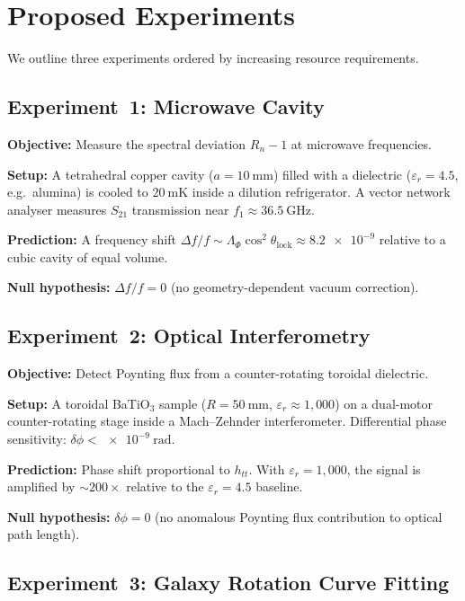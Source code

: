 \documentclass[aps,preprint,superscriptaddress,longbibliography]{revtex4-2}
\begin{document}
\section{Proposed Experiments}
\label{sec:experiments}

We outline three experiments ordered by increasing resource
requirements.

\subsection{Experiment~1: Microwave Cavity}

\textbf{Objective:} Measure the spectral deviation $R_n - 1$ at
microwave frequencies.

\textbf{Setup:} A tetrahedral copper cavity ($a = \SI{10}{\milli\metre}$)
filled with a dielectric ($\varepsilon_r = 4.5$, e.g.\ alumina) is
cooled to $\SI{20}{\milli\kelvin}$ inside a dilution refrigerator.
A vector network analyser measures $S_{21}$ transmission near
$f_1 \approx \SI{36.5}{\giga\hertz}$.

\textbf{Prediction:} A frequency shift
$\Delta f / f \sim \Lambda_\Phi \cos^2\theta_{\mathrm{lock}}
\approx \num{8.2e-9}$ relative to a cubic cavity of equal volume.

\textbf{Null hypothesis:} $\Delta f / f = 0$ (no geometry-dependent
vacuum correction).

\subsection{Experiment~2: Optical Interferometry}

\textbf{Objective:} Detect Poynting flux from a counter-rotating
toroidal dielectric.

\textbf{Setup:} A toroidal BaTiO$_3$ sample ($R = \SI{50}{\milli\metre}$,
$\varepsilon_r \approx 1{,}000$) on a dual-motor counter-rotating
stage inside a Mach--Zehnder interferometer.  Differential phase
sensitivity: $\delta\phi < \SI{e-9}{\radian}$.

\textbf{Prediction:} Phase shift proportional to $h_{tt}$.  With
$\varepsilon_r = 1{,}000$, the signal is amplified by
$\sim\!200\times$ relative to the $\varepsilon_r = 4.5$ baseline.

\textbf{Null hypothesis:} $\delta\phi = 0$ (no anomalous Poynting
flux contribution to optical path length).

\subsection{Experiment~3: Galaxy Rotation Curve Fitting}
\end{document}
